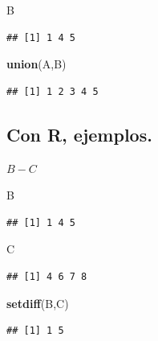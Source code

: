 \documentclass[]{book}
\newenvironment{Shaded}{\begin{snugshade}}{\end{snugshade}}
\newcommand{\KeywordTok}[1]{\textcolor[rgb]{0.13,0.29,0.53}{\textbf{#1}}}
\newcommand{\NormalTok}[1]{#1}
\begin{document}
\begin{Shaded}
\begin{Highlighting}[]
\NormalTok{B}
\end{Highlighting}
\end{Shaded}

\begin{verbatim}
## [1] 1 4 5
\end{verbatim}

\begin{Shaded}
\begin{Highlighting}[]
\KeywordTok{union}\NormalTok{(A,B)}
\end{Highlighting}
\end{Shaded}

\begin{verbatim}
## [1] 1 2 3 4 5
\end{verbatim}

\hypertarget{con-r-ejemplos.-4}{%
\subsection{Con R, ejemplos.}\label{con-r-ejemplos.-4}}

\(B-C\)

\begin{Shaded}
\begin{Highlighting}[]
\NormalTok{B}
\end{Highlighting}
\end{Shaded}

\begin{verbatim}
## [1] 1 4 5
\end{verbatim}

\begin{Shaded}
\begin{Highlighting}[]
\NormalTok{C}
\end{Highlighting}
\end{Shaded}

\begin{verbatim}
## [1] 4 6 7 8
\end{verbatim}

\begin{Shaded}
\begin{Highlighting}[]
\KeywordTok{setdiff}\NormalTok{(B,C)}
\end{Highlighting}
\end{Shaded}

\begin{verbatim}
## [1] 1 5
\end{verbatim}
\end{document}
